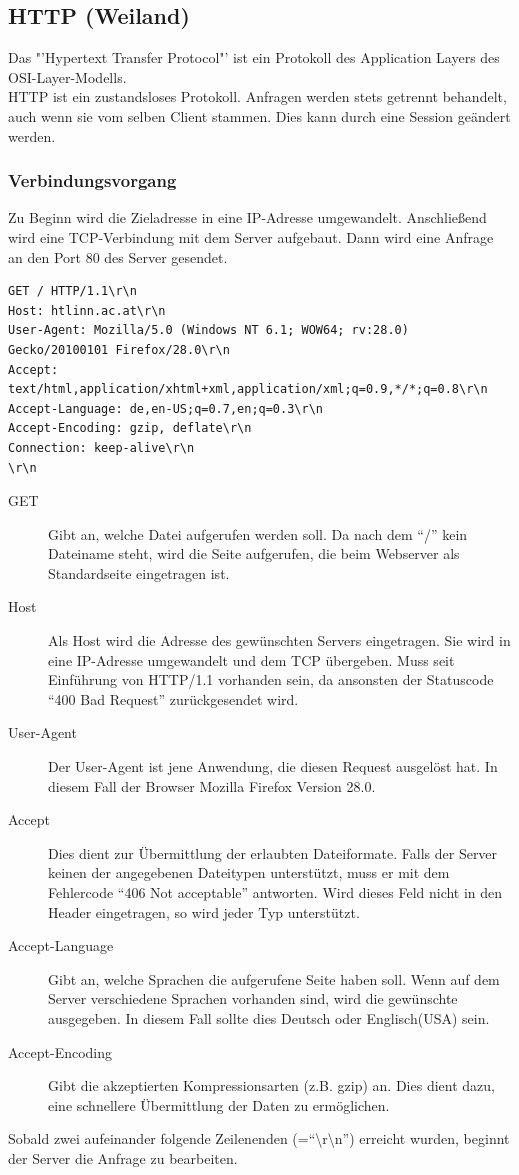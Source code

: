 \subsection{HTTP (Weiland)}
\label{sec:content_tech_https}
Das "'Hypertext Transfer Protocol"' ist ein Protokoll des Application Layers des OSI-Layer-Modells.
\\
HTTP ist ein zustandsloses Protokoll. Anfragen werden stets getrennt behandelt, auch wenn sie vom selben Client stammen. Dies kann durch eine Session geändert werden.
\subsubsection{Verbindungsvorgang}
Zu Beginn wird die Zieladresse in eine IP-Adresse umgewandelt.
Anschließend wird eine TCP-Verbindung  mit dem Server aufgebaut. 
Dann wird eine Anfrage an den Port 80 des Server gesendet.
\\
\begin{lstlisting}[style=custom, caption={HTTP-Request},label={lst:content_http_request}]
GET / HTTP/1.1\r\n
Host: htlinn.ac.at\r\n
User-Agent: Mozilla/5.0 (Windows NT 6.1; WOW64; rv:28.0) Gecko/20100101 Firefox/28.0\r\n
Accept: text/html,application/xhtml+xml,application/xml;q=0.9,*/*;q=0.8\r\n
Accept-Language: de,en-US;q=0.7,en;q=0.3\r\n
Accept-Encoding: gzip, deflate\r\n
Connection: keep-alive\r\n
\r\n
\end{lstlisting}

\begin{description}
\item[GET] Gibt an, welche Datei aufgerufen werden soll. Da nach dem \enquote{/} kein Dateiname steht, wird die Seite aufgerufen, die beim Webserver als Standardseite eingetragen ist.
\item[Host] Als Host wird die Adresse des gewünschten Servers eingetragen. Sie wird in eine IP-Adresse umgewandelt und dem TCP übergeben. Muss seit Einführung von HTTP/1.1 vorhanden sein, da ansonsten der Statuscode \enquote{400 Bad Request} zurückgesendet wird.
\item[User-Agent] Der User-Agent ist jene Anwendung, die diesen Request ausgelöst hat. In diesem Fall der Browser Mozilla Firefox Version 28.0.
\item[Accept] Dies dient zur Übermittlung der erlaubten Dateiformate. Falls der Server keinen der angegebenen Dateitypen unterstützt, muss er mit dem Fehlercode \enquote{406 Not acceptable} antworten. Wird dieses Feld nicht in den Header eingetragen, so wird jeder Typ unterstützt.
\item[Accept-Language] Gibt an, welche Sprachen die aufgerufene Seite haben soll. Wenn auf dem Server verschiedene Sprachen vorhanden sind, wird die gewünschte ausgegeben. In diesem Fall sollte dies Deutsch oder Englisch(USA) sein. 
\item[Accept-Encoding] Gibt die akzeptierten Kompressionsarten (z.B. gzip) an. Dies dient dazu, eine schnellere Übermittlung der Daten zu ermöglichen.
\end{description} 
Sobald zwei aufeinander folgende Zeilenenden (=\enquote{\textbackslash r\textbackslash n}) erreicht wurden, beginnt der Server die Anfrage zu bearbeiten.

